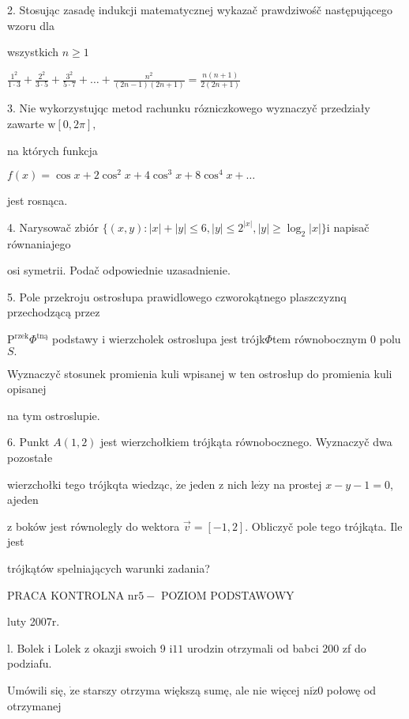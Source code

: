 \documentclass[a4paper,12pt]{article}
\begin{document}
2. Stosując zasadę indukcji matematycznej wykazač prawdziwośč następującego wzoru dla

wszystkich $n\geq 1$

$\displaystyle \frac{1^{2}}{1\cdot 3}+\frac{2^{2}}{3\cdot 5}+\frac{3^{2}}{5\cdot 7}+\ldots+\frac{n^{2}}{(2n-1)(2n+1)}=\frac{n(n+1)}{2(2n+1)}$

3. Nie wykorzystujqc metod rachunku rózniczkowego wyznaczyč przedziały zawarte $\mathrm{w}[0,2\pi],$

na których funkcja

$ f(x)=\cos x+2\cos^{2}x+4\cos^{3}x+8\cos^{4}x+\ldots$

jest rosnąca.

4. Narysowač zbiór $\{(x,y):|x|+|y|\leq 6,|y|\leq 2^{|x|},|y|\geq\log_{2}|x|\}\mathrm{i}$ napisač równaniajego

osi symetrii. Podač odpowiednie uzasadnienie.

5. Pole przekroju ostrosłupa prawidlowego czworokątnego plaszczyznq przechodzącą przez

$\mathrm{P}^{\mathrm{r}\mathrm{z}\mathrm{e}\mathrm{k}}\Phi^{\mathrm{t}\mathrm{n}\text{ą}}$ podstawy $\mathrm{i}$ wierzcholek ostroslupa jest trójk$\Phi$tem równobocznym $0$ polu $S.$

Wyznaczyč stosunek promienia kuli wpisanej $\mathrm{w}$ ten ostrosłup do promienia kuli opisanej

na tym ostroslupie.

6. Punkt $A(1,2)$ jest wierzchołkiem trójkąta równobocznego. Wyznaczyč dwa pozostałe

wierzchołki tego trójkqta wiedząc, $\dot{\mathrm{z}}\mathrm{e}$ jeden $\mathrm{z}$ nich $\mathrm{l}\mathrm{e}\dot{\mathrm{z}}\mathrm{y}$ na prostej $x-y-1=0$, ajeden

$\mathrm{z}$ boków jest równolegly do wektora $\vec{v}= [-1,2]$. Obliczyč pole tego trójkąta. Ile jest

trójkątów spelniających warunki zadania?





PRACA KONTROLNA $\mathrm{n}\mathrm{r}5-$ POZIOM PODSTAWOWY

luty 2007r.

l. Bolek $\mathrm{i}$ Lolek $\mathrm{z}$ okazji swoich 9 $\mathrm{i} 11$ urodzin otrzymali od babci 200 zf do podziafu.

Umówili się, $\dot{\mathrm{z}}\mathrm{e}$ starszy otrzyma większą sumę, ale nie więcej $\mathrm{n}\mathrm{i}\dot{\mathrm{z}}0$ połowę od otrzymanej
\end{document}

